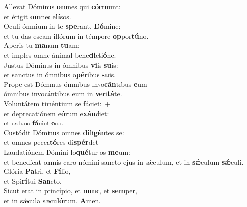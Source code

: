 \evenverse Allevat Dóminus \textbf{om}nes qui \textbf{cór}ruunt:~\*\\
\evenverse et érigit \textbf{om}nes e\textbf{lí}sos.\\
\oddverse Oculi ómnium in te \textbf{spe}rant, \textbf{Dó}mine:~\*\\
\oddverse et tu das escam illórum in témpore \textbf{op}por\textbf{tú}no.\\
\evenverse Aperis tu \textbf{ma}num \textbf{tu}am:~\*\\
\evenverse et imples omne ánimal bene\textbf{di}cti\textbf{ó}ne.\\
\oddverse Justus Dóminus in ómnibus \textbf{vi}is \textbf{su}is:~\*\\
\oddverse et sanctus in ómnibus o\textbf{pé}ribus \textbf{su}is.\\
\evenverse Prope est Dóminus ómnibus invo\textbf{cán}tibus \textbf{e}um:~\*\\
\evenverse ómnibus invocántibus eum in \textbf{ve}ri\textbf{tá}te.\\
\oddverse Voluntátem timéntium se fáciet:~+\\
\oddverse  et deprecatiónem e\textbf{ó}rum e\textbf{xáu}diet:~\*\\
\oddverse et salvos \textbf{fá}ciet \textbf{e}os.\\
\evenverse Custódit Dóminus omnes \textbf{di}li\textbf{gén}tes se:~\*\\
\evenverse et omnes pecca\textbf{tó}res di\textbf{spér}det.\\
\oddverse Laudatiónem Dómini lo\textbf{qué}tur os \textbf{me}um:~\*\\
\oddverse et benedícat omnis caro nómini sancto ejus in sǽculum, et in \textbf{sǽ}culum \textbf{sǽ}culi.\\
\evenverse Glória \textbf{Pa}tri, et \textbf{Fí}lio,~\*\\
\evenverse et Spi\textbf{rí}tui \textbf{San}cto.\\
\oddverse Sicut erat in princípio, et \textbf{nunc}, et \textbf{sem}per,~\*\\
\oddverse et in sǽcula sæcu\textbf{ló}rum. \textbf{A}men.\\
